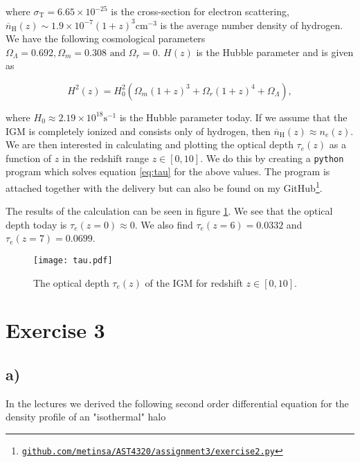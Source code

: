 \documentclass[a4paper]{article}
\begin{document}
\noindent where $\sigma _ { \mathrm { T } } = 6.65 \times 10^{-25}$ is the cross-section
for electron scattering, $\overline { n } _ { \mathrm { H } } ( z ) \sim 1.9 \times 10 ^
{ - 7 } ( 1 + z ) ^ { 3 } \mathrm{cm}^{-3}$ is the average number density of hydrogen.
We have the following cosmological parameters $\Omega _ { \Lambda } = 0.692 , 
\Omega _ { m } = 0.308 \text { and } \Omega _ { r } = 0$. $H(z)$ is the Hubble parameter
and is given as

\begin{equation}\label{eq:hub}
    H ^ { 2 } ( z ) = H _ { 0 } ^ { 2 } \left( \Omega _ { m } ( 1 + z ) ^ { 3 } + \Omega
    _ { r } ( 1 + z ) ^ { 4 } + \Omega _ { \Lambda } \right),
\end{equation}

\noindent where $H_0 \approx 2.19\times 10^{18} \mathrm{s}^{-1}$ is the Hubble parameter
today. If we assume that the IGM is completely ionized and consists only of hydrogen,
then $\overline { n } _ { \mathrm { H } } ( z ) \approx n_e(z)$. We are then interested
in calculating and plotting the optical depth $\tau_e(z)$ as a function of $z$ in the
redshift range $z\in [0,10]$. We do this by creating a \texttt{python} program which solves equation \eqref{eq:tau} for the above values. The program is attached together with the
delivery but can also be found on my
GitHub\footnote{\href{https://github.com/MetinSa/AST4320/blob/master/Assignment3/Exercise2.py
}{\texttt{github.com/metinsa/AST4320/assignment3/exercise2.py}}}. 

The results of the calculation can be seen in figure \ref{fig:tau}. We see that the
optical depth today is $\tau_e(z = 0)\approx 0$. We also find $\tau_e(z = 6) = 0.0332$
and $\tau_e(z = 7) = 0.0699$.

\begin{figure}
    \centering
    \texttt{[image: tau.pdf]}
    \caption{The optical depth $\tau_e(z)$ of the IGM for redshift $z\in [0,10]$.}
    \label{fig:tau}
\end{figure}

\section*{Exercise 3}
\subsection*{a)}

In the lectures we derived the following second order differential equation for the
density profile of an "isothermal" halo
\end{document}
